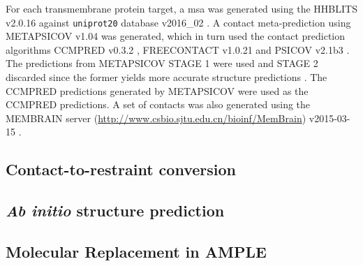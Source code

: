 For each transmembrane protein target, a \gls{msa} was generated using the HHBLITS v2.0.16 \cite{Remmert2011-kt} against \texttt{uniprot20} database v2016\_02 \cite{Bateman2017-pb}. A contact meta-prediction using METAPSICOV v1.04 \cite{Jones2015-vq} was generated, which in turn used the contact prediction algorithms CCMPRED v0.3.2 \cite{Seemayer2014-zp}, FREECONTACT v1.0.21 \cite{Kajan2014-bx} and PSICOV v2.1b3 \cite{Jones2012-ks}. The predictions from METAPSICOV STAGE 1 were used and STAGE 2 discarded since the former yields more accurate structure predictions \cite{Jones2015-vq}. The CCMPRED predictions generated by METAPSICOV were used as the CCMPRED predictions. A set of contacts was also generated using the MEMBRAIN server (\href{http://www.csbio.sjtu.edu.cn/bioinf/MemBrain}{http://www.csbio.sjtu.edu.cn/bioinf/MemBrain}) v2015-03-15 \cite{Yang2013-bf}.

\subsection{Contact-to-restraint conversion}
\subsection{\textit{Ab initio} structure prediction}
\subsection{Molecular Replacement in AMPLE}
